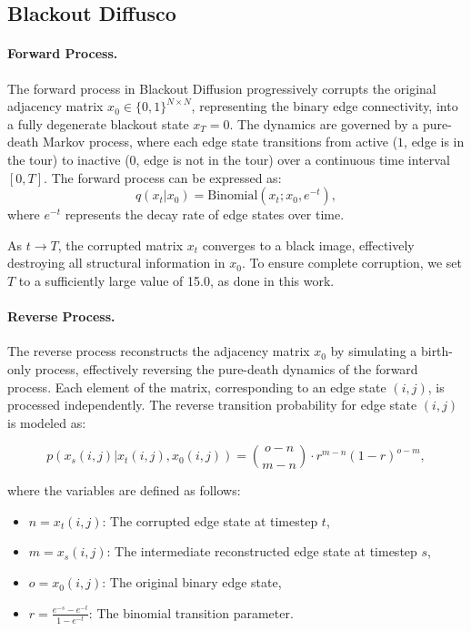 \subsection{Blackout Diffusco}
\paragraph{Forward Process.}  
The forward process in Blackout Diffusion progressively corrupts the original adjacency matrix \( x_0 \in \{0, 1\}^{N \times N} \), representing the binary edge connectivity, into a fully degenerate blackout state \( x_T = 0 \). The dynamics are governed by a pure-death Markov process, where each edge state transitions from active (\(1\), edge is in the tour) to inactive (\(0\), edge is not in the tour) over a continuous time interval \([0, T]\). The forward process can be expressed as:
\[
q(x_t | x_0) = \mathrm{Binomial}(x_t; x_0, e^{-t}),
\]
where \( e^{-t} \) represents the decay rate of edge states over time. 

As \( t \to T \), the corrupted matrix \( x_t \) converges to a black image, effectively destroying all structural information in \( x_0 \). To ensure complete corruption, we set \( T \) to a sufficiently large value of 15.0, as done in this work.

\paragraph{Reverse Process.}  
The reverse process reconstructs the adjacency matrix \( x_0 \) by simulating a birth-only process, effectively reversing the pure-death dynamics of the forward process. Each element of the matrix, corresponding to an edge state \((i, j)\), is processed independently. The reverse transition probability for edge state \((i, j)\) is modeled as:


\begin{equation}
p(x_{s}(i, j) | x_t(i, j), x_0(i, j)) = 
\binom{o - n}{m - n} \cdot r^{m-n} (1 - r)^{o-m},
\label{eq:blackout_reverse}
\end{equation}


where the variables are defined as follows:
\begin{itemize}
    \item \( n = x_t(i, j) \): The corrupted edge state at timestep \( t \),
    \item \( m = x_{s}(i, j) \): The intermediate reconstructed edge state at timestep \( s \),
    \item \( o = x_0(i, j) \): The original binary edge state,
    \item \( r = \frac{e^{-s} - e^{-t}}{1 - e^{-t}} \): The binomial transition parameter.
\end{itemize}

